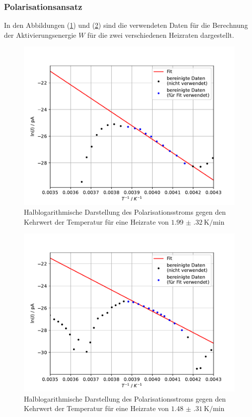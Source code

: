 \subsubsection{Polarisationsansatz}
In den Abbildungen (\ref{fig:3}) und (\ref{fig:4}) sind die verwendeten Daten für die Berechnung der Aktivierungsenergie $W$ für die zwei verschiedenen Heizraten dargestellt.
\begin{figure}[h!]
  \centering
  \includegraphics[scale=0.8]{fig/plot3.pdf}
  \caption{Halblogarithmische Darstellung des Polarisationsstroms gegen den Kehrwert der Temperatur für eine Heizrate von $\SI{1.99(32)}{\kelvin\per\minute}$}
  \label{fig:3}
\end{figure}
\begin{figure}[h!]
  \centering
  \includegraphics[scale=0.8]{fig/plot4.pdf}
  \caption{Halblogarithmische Darstellung des Polarisationsstroms gegen den Kehrwert der Temperatur für eine Heizrate von $\SI{1.48(31)}{\kelvin\per\minute}$}
  \label{fig:4}
\end{figure}
